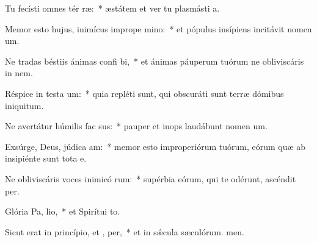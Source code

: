 \item Tu fecísti omnes tér ræ:~* æstátem et ver tu plasmásti a.
\item Memor esto hujus, inimícus imprope mino:~* et pópulus insípiens incitávit nomen um.
\item Ne tradas béstiis ánimas confi bi,~* et ánimas páuperum tuórum ne obliviscáris in nem.
\item Réspice in testa um:~* quia repléti sunt, qui obscuráti sunt terræ dómibus iniquitum.
\item Ne avertátur húmilis fac sus:~* pauper et inops laudábunt nomen um.
\item Exsúrge, Deus, júdica  am:~* memor esto improperiórum tuórum, eórum quæ ab insipiénte sunt tota e.
\item Ne obliviscáris voces inimicó rum:~* supérbia eórum, qui te odérunt, ascéndit per.
\item Glória Pa,  lio,~* et Spirítui to.
\item Sicut erat in princípio, et ,  per,~* et in sǽcula sæculórum. men.
